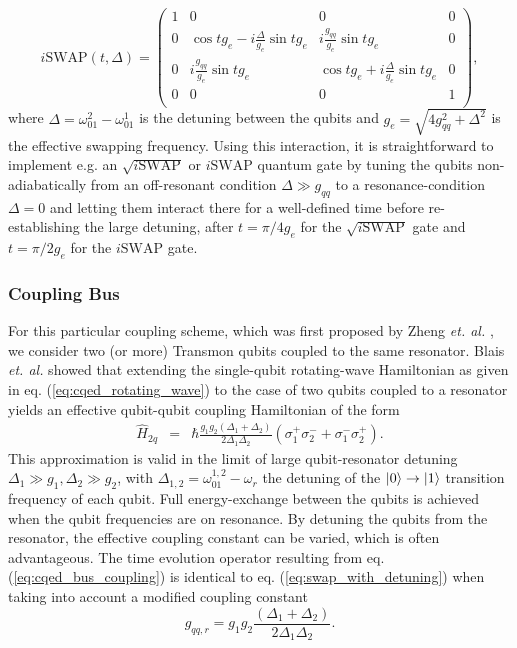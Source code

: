 %
\begin{equation}
i\mathrm{SWAP}(t,\Delta) = \left(
			\begin{array}{cccc}
				1 & 0 & 0 & 0 \\
				0 & \cos{t g_{e}}-i\frac{\Delta}{g_e}\sin{t g_{e}} & i \frac{g_{qq}}{g_e}\sin{t g_{e}} & 0 \\
				0 & i\frac{g_{qq}}{g_e}\sin{t g_{e}} & \cos{t g_{e}}+i\frac{\Delta}{g_{e}}\sin{t g_{e}} & 0 \\
				0 & 0 & 0 & 1 \\
			\end{array}
	\right), \label{eq:swap_with_detuning}
\end{equation}
%
where $\Delta = \omega_{01}^2-\omega_{01}^1$ is the detuning between the qubits and $g_e = \sqrt{4g_{qq}^2+\Delta^2}$ is the effective swapping frequency. Using this interaction, it is straightforward to implement e.g. an $\sqrt{i\mathrm{SWAP}}$ or $i\mathrm{SWAP}$ quantum gate by tuning the qubits non-adiabatically from an off-resonant condition $\Delta \gg g_{qq}$ to a resonance-condition $\Delta = 0$ and letting them interact there for a well-defined time before re-establishing the large detuning, after $t=\pi/4g_e$ for the $\sqrt{i\mathrm{SWAP}}$ gate and $t=\pi/2g_e$ for the $i\mathrm{SWAP}$ gate.

\subsubsection{Coupling Bus}

For this particular coupling scheme, which was first proposed by Zheng {\it et. al.} \citep{zheng_efficient_2000,zheng_one-step_2001,osnaghi_coherent_2001}, we consider two (or more) Transmon qubits coupled to the same resonator. Blais {\it et. al.} \citep{blais_quantum-information_2007} showed that extending the single-qubit rotating-wave Hamiltonian as given in eq. (\ref{eq:cqed_rotating_wave}) to the case of two qubits coupled to a resonator yields an effective qubit-qubit coupling Hamiltonian of the form
%
\begin{eqnarray}
\hat{H}_{2q} & = & \hbar\frac{g_1 g_2(\Delta_1+\Delta_2)}{2\Delta_1\Delta_2}(\sigma_1^+\sigma_2^-+\sigma_1^-\sigma_2^+). \label{eq:cqed_bus_coupling}
\end{eqnarray}
%
This approximation is valid in the limit of large qubit-resonator detuning $\Delta_1 \gg g_1,\Delta_2 \gg g_2$, with $\Delta_{1,2} = \omega_{01}^{1,2}-\omega_r$ the detuning of the $\left| 0 \right>\to\left| 1 \right>$ transition frequency of each qubit. Full energy-exchange between the qubits is achieved when the qubit frequencies are on resonance. By detuning the qubits from the resonator, the effective coupling constant can be varied, which is often advantageous. The time evolution operator resulting from eq. (\ref{eq:cqed_bus_coupling}) is identical to eq. (\ref{eq:swap_with_detuning}) when taking into account a modified coupling constant
%
\begin{equation}
g_{qq,r}=g_1 g_2\frac{(\Delta_1+\Delta_2)}{2\Delta_1\Delta_2}. \label{eq:cqed_bus_coupling_rate}
\end{equation}
%
